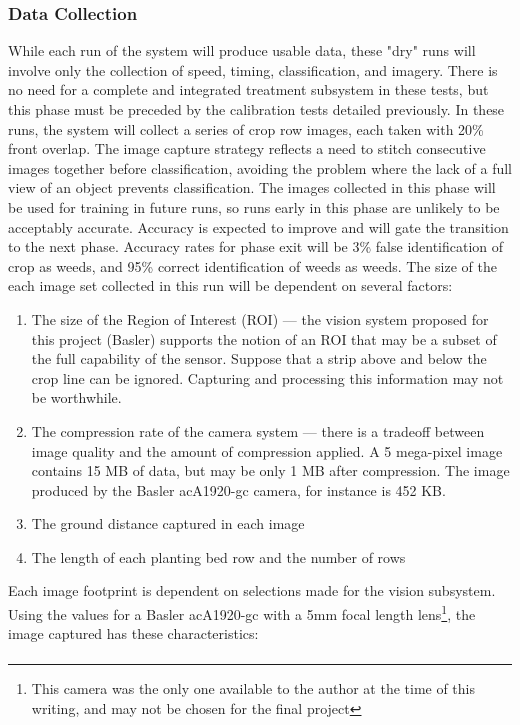 \documentclass[12pt]{article}
\begin{document}
{\subsubsection{Data Collection}
While each run of the system will produce usable data, these "dry" runs will involve only the collection of speed, timing, classification, and imagery. There is no need for a complete and integrated treatment subsystem in these tests, but this phase must be preceded by the calibration tests detailed previously.
 In these runs, the system will collect a series of crop row images, each taken with 20\% front overlap. The image capture strategy reflects a need to stitch consecutive images together before classification, avoiding the problem where the lack of a full view of an object prevents classification. The images collected in this phase will be used for training in future runs, so runs early in this phase are unlikely to be acceptably accurate. Accuracy is expected to improve and will gate the transition to the next phase. Accuracy rates for phase exit will be 3\% false identification of crop as weeds, and 95\% correct identification of weeds as weeds.
The size of the each image set collected in this run will be dependent on several factors:
\begin{enumerate}
	\item{The size of the Region of Interest (ROI) --- the vision system proposed for this project (Basler) supports the notion of an ROI that may be a subset of the full capability of the sensor. Suppose that a strip above and below the crop line can be ignored. Capturing and processing this information may not be worthwhile.}
	\item{The compression rate of the camera system --- there is a tradeoff between image quality and the amount of compression applied. A 5 mega-pixel image contains 15 MB of data, but may be only 1 MB after compression. The image produced by the Basler acA1920-gc camera, for instance is 452 KB.}
	\item{The ground distance captured in each image}
	\item{The length of each planting bed row and the number of rows}
\end{enumerate}
Each image footprint is dependent on selections made for the vision subsystem. Using the values for a Basler acA1920-gc with a 5mm focal length lens\footnote{This camera was the only one available to the author at the time of this writing, and may not be chosen for the final project}, the image captured has these characteristics:
\begin{align}

\end{align}}
\end{document}
